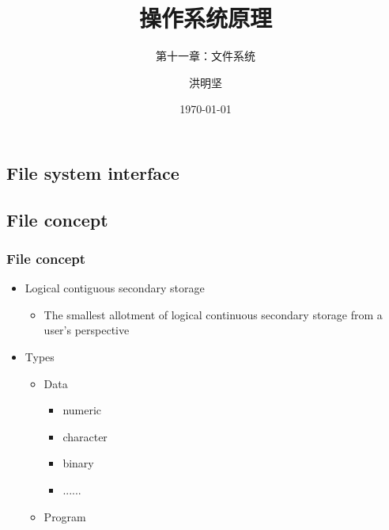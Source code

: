 \documentclass[CJKutf8,xcolor=pdftex,dvipsnames,table]{beamer}
\begin{document}
\begin{CJK*}{UTF8}{song}

  \title{ 操作系统原理}
  \subtitle{ 第十一章：文件系统}
  \author{ 洪明坚}
  \date{\today}
  
  
  \frame{\titlepage}


  \section{File system interface}
  
  \subsection{File concept}
  
  \begin{frame}
    \frametitle{File concept} \pause
    \begin{itemize}
    \item Logical contiguous secondary storage \pause
      \begin{itemize}
      \item The smallest allotment of logical continuous secondary storage from a user's perspective \pause
      \end{itemize}
    \item Types \pause
      \begin{itemize}
      \item Data \pause
        \begin{itemize}
        \item numeric \pause
        \item character \pause
        \item binary \pause
        \item ...... \pause
        \end{itemize}
      \item Program
      \end{itemize}
    \end{itemize}
  \end{frame}


\end{CJK*}
\end{document}
